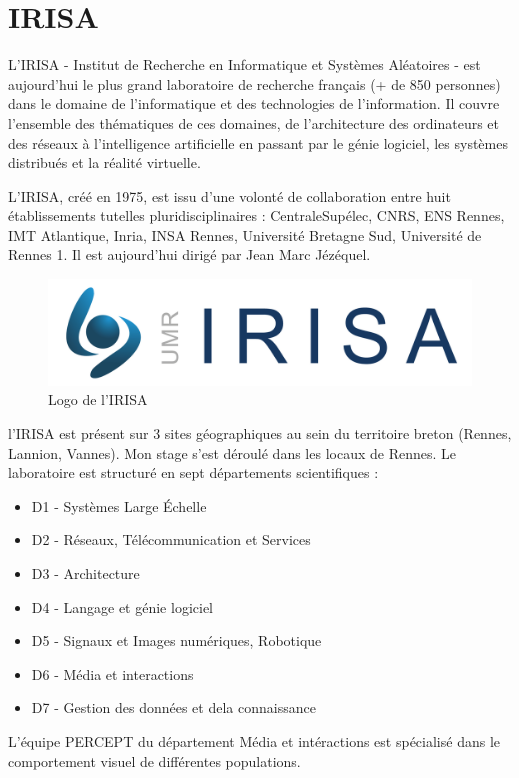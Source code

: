 \chapter{IRISA}

\par
L'IRISA - Institut de Recherche en Informatique et Systèmes Aléatoires - est
aujourd'hui le plus grand laboratoire de recherche français (+ de 850 personnes)
dans le domaine de l'informatique et des technologies de l'information. Il
couvre l'ensemble des thématiques de ces domaines, de l'architecture des
ordinateurs et des réseaux à l'intelligence artificielle en passant par le génie
logiciel, les systèmes distribués et la réalité virtuelle.

\par
L'IRISA, créé en 1975, est issu d'une volonté de collaboration entre huit établissements tutelles pluridisciplinaires : CentraleSupélec, CNRS, ENS Rennes, IMT Atlantique, Inria, INSA Rennes, Université Bretagne Sud, Université de Rennes 1. Il est aujourd'hui dirigé par Jean Marc Jézéquel.

\begin{figure}[h]
    \centering
    \includegraphics[width=0.7\linewidth]{datas/logo_irisa.jpg}
    \caption{Logo de l'IRISA}
\end{figure}

\par
l'IRISA est présent sur 3 sites géographiques au sein du territoire breton (Rennes, Lannion, Vannes). Mon stage s'est déroulé dans les locaux de Rennes.
Le laboratoire est structuré en sept départements scientifiques :
\begin{itemize}
    \item D1 - Systèmes Large Échelle
    \item D2 - Réseaux, Télécommunication et Services
    \item D3 - Architecture
    \item D4 - Langage et génie logiciel
    \item D5 - Signaux et Images numériques, Robotique
    \item D6 - Média et interactions
    \item D7 - Gestion des données et dela connaissance
\end{itemize}


\par
L'équipe PERCEPT du département Média et intéractions est spécialisé dans le comportement visuel de différentes populations.